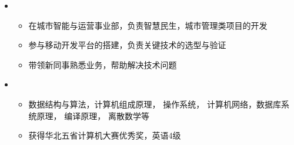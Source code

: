   \begin{itemize}[leftmargin=*]
    \item
      {\small
      \begin{itemize}
		\item 在城市智能与运营事业部，负责智慧民生，城市管理类项目的开发
		\item 参与移动开发平台的搭建，负责关键技术的选型与验证
		\item 带领新同事熟悉业务，帮助解决技术问题
      \end{itemize}
      }
    \item
      {\small
      \begin{itemize}
        \item{数据结构与算法，计算机组成原理， 操作系统， 计算机网络，数据库系统原理， 编译原理， 离散数学等}
        \item 获得华北五省计算机大赛优秀奖，英语4级
      \end{itemize}
      }
  \end{itemize}
